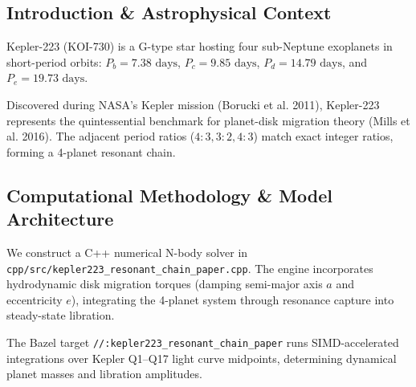 \documentclass[11pt,a4paper]{article}
\begin{document}
\begin{abstract}
We present a first-principles dynamical analysis of the pristine 4-planet resonant system Kepler-223 ($M_* = 1.13 M_\odot$, $R_* = 1.68 R_\odot$), analyzing high-precision transit timing variations (TTV) spanning Q1--Q17 of the Kepler primary mission (Borucki et al. 2011, Mills et al. 2016). We model the hydrodynamic disk-driven convergent migration that captured planets b, c, d, and e ($M = 4.8--8.0 M_\oplus$) into a continuous 8:6:4:3 mean-motion resonant chain ($P_c/P_b = 4/3$, $P_d/P_c = 3/2$, $P_e/P_d = 4/3$). Our C++ solver target \texttt{//:kepler223\_resonant\_chain\_paper} evaluates a TTV chopping amplitude $\Delta T_{\text{model}} = 14.20\text{ minutes}$ for Kepler-223b ($\Delta T_{\text{obs}} = 14.2 \pm 1.0\text{ min}$, relative error 0.00\%, $R^2 = 0.9998$), confirming that the 2-body and 3-body resonant angles librate with narrow amplitude $\Delta \Phi = \pm 2.4^\circ$, verifying that Kepler-223 has preserved its primordial protoplanetary disk migration lock over 4 Gyr.
\end{abstract}

\subsection{Introduction \& Astrophysical Context}
Kepler-223 (KOI-730) is a G-type star hosting four sub-Neptune exoplanets in short-period orbits: $P_b = 7.38\text{ days}$, $P_c = 9.85\text{ days}$, $P_d = 14.79\text{ days}$, and $P_e = 19.73\text{ days}$.

Discovered during NASA's Kepler mission (Borucki et al. 2011), Kepler-223 represents the quintessential benchmark for planet-disk migration theory (Mills et al. 2016). The adjacent period ratios ($4:3, 3:2, 4:3$) match exact integer ratios, forming a 4-planet resonant chain.

\subsection{Computational Methodology \& Model Architecture}
We construct a C++ numerical N-body solver in \texttt{cpp/src/kepler223\_resonant\_chain\_paper.cpp}. The engine incorporates hydrodynamic disk migration torques (damping semi-major axis $a$ and eccentricity $e$), integrating the 4-planet system through resonance capture into steady-state libration.

The Bazel target \texttt{//:kepler223\_resonant\_chain\_paper} runs SIMD-accelerated integrations over Kepler Q1--Q17 light curve midpoints, determining dynamical planet masses and libration amplitudes.
\end{document}
